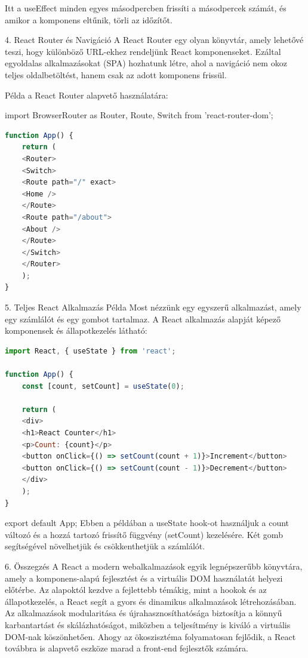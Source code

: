 \documentclass[colorlinks]{thesis-kando}
\theoremstyle{definition}
\theoremstyle{remark}
\begin{document}
Itt a useEffect minden egyes másodpercben frissíti a másodpercek számát, és amikor a komponens eltűnik, törli az időzítőt.

4. React Router és Navigáció
A React Router egy olyan könyvtár, amely lehetővé teszi, hogy különböző URL-ekhez rendeljünk React komponenseket. Ezáltal egyoldalas alkalmazásokat (SPA) hozhatunk létre, ahol a navigáció nem okoz teljes oldalbetöltést, hanem csak az adott komponens frissül.

Példa a React Router alapvető használatára:

import { BrowserRouter as Router, Route, Switch } from 'react-router-dom';

\begin{lstlisting}[language=JavaScript]
function App() {
	return (
	<Router>
	<Switch>
	<Route path="/" exact>
	<Home />
	</Route>
	<Route path="/about">
	<About />
	</Route>
	</Switch>
	</Router>
	);
}
\end{lstlisting}


5. Teljes React Alkalmazás Példa
Most nézzünk egy egyszerű alkalmazást, amely egy számlálót és egy gombot tartalmaz. A React alkalmazás alapját képező komponensek és állapotkezelés látható:

\begin{lstlisting}[language=JavaScript]
import React, { useState } from 'react';

function App() {
	const [count, setCount] = useState(0);
	
	return (
	<div>
	<h1>React Counter</h1>
	<p>Count: {count}</p>
	<button onClick={() => setCount(count + 1)}>Increment</button>
	<button onClick={() => setCount(count - 1)}>Decrement</button>
	</div>
	);
}
\end{lstlisting}
export default App;
Ebben a példában a useState hook-ot használjuk a count változó és a hozzá tartozó frissítő függvény (setCount) kezelésére. Két gomb segítségével növelhetjük és csökkenthetjük a számlálót.

6. Összegzés
A React a modern webalkalmazások egyik legnépszerűbb könyvtára, amely a komponens-alapú fejlesztést és a virtuális DOM használatát helyezi előtérbe. Az alapoktól kezdve a fejlettebb témákig, mint a hookok és az állapotkezelés, a React segít a gyors és dinamikus alkalmazások létrehozásában. Az alkalmazások modularitása és újrahasznosíthatósága biztosítja a könnyű karbantartást és skálázhatóságot, miközben a teljesítmény is kiváló a virtuális DOM-nak köszönhetően. Ahogy az ökoszisztéma folyamatosan fejlődik, a React továbbra is alapvető eszköze marad a front-end fejlesztők számára.
\end{document}
